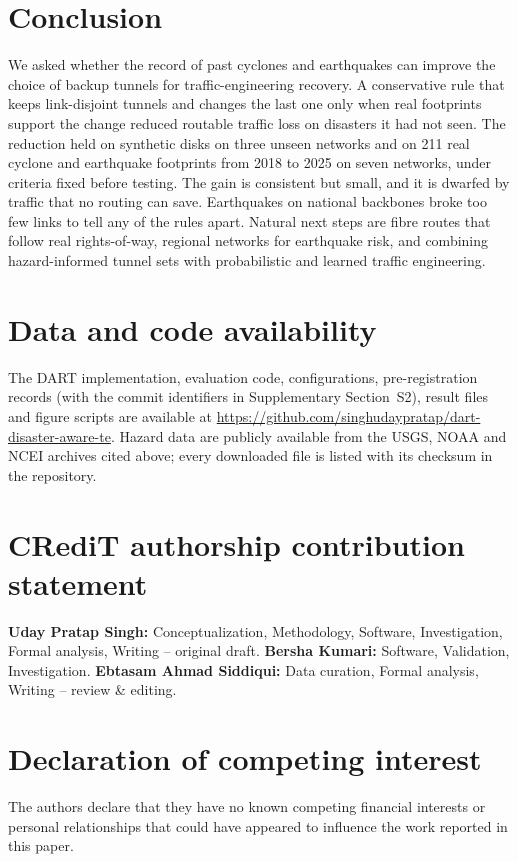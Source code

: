 \documentclass[preprint,12pt]{elsarticle}
\begin{document}
\section{Conclusion}
\label{sec:conclusion}

We asked whether the record of past cyclones and earthquakes can improve the choice of backup tunnels for traffic-engineering recovery. A conservative rule that keeps link-disjoint tunnels and changes the last one only when real footprints support the change reduced routable traffic loss on disasters it had not seen. The reduction held on synthetic disks on three unseen networks and on 211 real cyclone and earthquake footprints from 2018 to 2025 on seven networks, under criteria fixed before testing. The gain is consistent but small, and it is dwarfed by traffic that no routing can save. Earthquakes on national backbones broke too few links to tell any of the rules apart. Natural next steps are fibre routes that follow real rights-of-way, regional networks for earthquake risk, and combining hazard-informed tunnel sets with probabilistic and learned traffic engineering.

\section*{Data and code availability}
\label{sec:data}
\sloppy The DART implementation, evaluation code, configurations, pre-registration records (with the commit identifiers in Supplementary Section~S2), result files and figure scripts are available at \url{https://github.com/singhudaypratap/dart-disaster-aware-te}. Hazard data are publicly available from the USGS, NOAA and NCEI archives cited above; every downloaded file is listed with its checksum in the repository.

\section*{CRediT authorship contribution statement}
\textbf{Uday Pratap Singh:} Conceptualization, Methodology, Software, Investigation, Formal analysis, Writing -- original draft. \textbf{Bersha Kumari:} Software, Validation, Investigation. \textbf{Ebtasam Ahmad Siddiqui:} Data curation, Formal analysis, Writing -- review \& editing.

\section*{Declaration of competing interest}
The authors declare that they have no known competing financial interests or personal relationships that could have appeared to influence the work reported in this paper.
\end{document}
